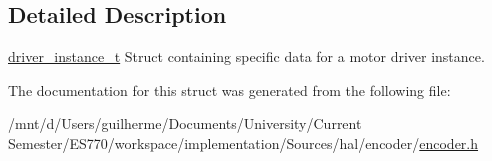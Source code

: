 \subsection{Detailed Description}
\hyperlink{structdriver__instance__t}{driver\-\_\-instance\-\_\-t} Struct containing specific data for a motor driver instance. 

The documentation for this struct was generated from the following file\-:\begin{DoxyCompactItemize}
\item 
/mnt/d/\-Users/guilherme/\-Documents/\-University/\-Current Semester/\-E\-S770/workspace/implementation/\-Sources/hal/encoder/\hyperlink{encoder_8h}{encoder.\-h}\end{DoxyCompactItemize}
